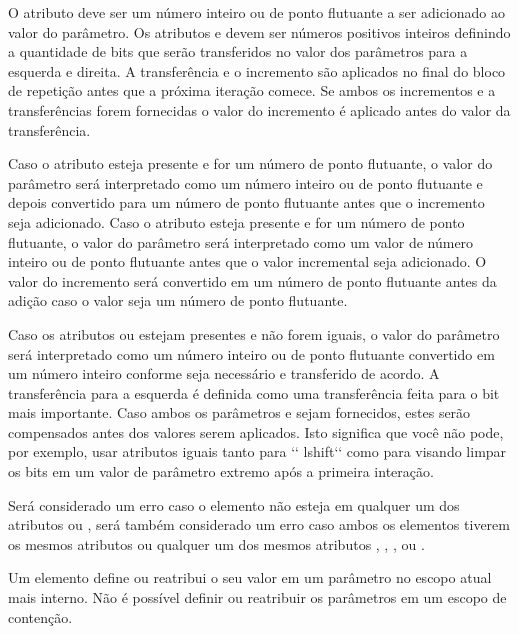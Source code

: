 \documentclass[letterpaper,10pt,brazil]{sphinxmanual}
\begin{document}
O atributo  deve ser um número inteiro ou de ponto
flutuante a ser adicionado ao valor do parâmetro. Os atributos
 e  devem ser números positivos inteiros definindo a
quantidade de bits que serão transferidos no valor dos parâmetros para a
esquerda e direita. A transferência e o incremento são aplicados no
final do bloco de repetição antes que a próxima iteração comece.
Se ambos os incrementos e a transferências forem fornecidas o valor
do incremento é aplicado antes do valor da transferência.

Caso o atributo  esteja presente e for um número de
ponto flutuante, o valor do parâmetro será interpretado como um número
inteiro ou de ponto flutuante e depois convertido para um número de
ponto flutuante antes que o incremento seja adicionado. Caso o atributo
 esteja presente e for um número de ponto flutuante, o
valor do parâmetro será interpretado como um valor de número inteiro ou
de ponto flutuante antes que o valor incremental seja adicionado.
O valor do incremento será convertido em um número de ponto flutuante
antes da adição caso o valor seja um número de ponto flutuante.

Caso os atributos  ou  estejam presentes e não
forem iguais, o valor do parâmetro será interpretado como um número
inteiro ou de ponto flutuante convertido em um número inteiro conforme
seja necessário e transferido de acordo. A transferência para a esquerda
é definida como uma transferência feita para o bit mais importante.
Caso ambos os parâmetros  e  sejam fornecidos, estes
serão compensados antes dos valores serem aplicados. Isto significa que
você não pode, por exemplo, usar atributos iguais tanto para
{}`{}` lshift{}`{}` como para  visando limpar os bits em um valor de
parâmetro extremo após a primeira interação.

Será considerado um erro caso o elemento  não esteja em
qualquer um dos atributos  ou , será também
considerado um erro caso ambos os elementos  tiverem  os mesmos
atributos  ou qualquer um dos mesmos atributos ,
, , ou .

Um elemento  define ou reatribui o seu valor em um parâmetro no
escopo atual mais interno. Não é possível definir ou reatribuir os
parâmetros em um escopo de contenção.
\clearpage
\end{document}
